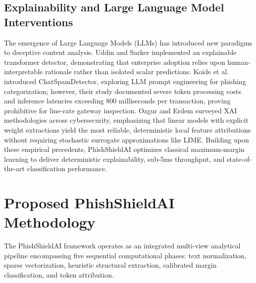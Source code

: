 \documentclass[conference]{IEEEtran}
\begin{document}
\subsection{Explainability and Large Language Model Interventions}
The emergence of Large Language Models (LLMs) has introduced new paradigms to deceptive content analysis. Uddin and Sarker \cite{uddin2024} implemented an explainable transformer detector, demonstrating that enterprise adoption relies upon human-interpretable rationale rather than isolated scalar predictions. Koide et al. \cite{koide2024} introduced ChatSpamDetector, exploring LLM prompt engineering for phishing categorization; however, their study documented severe token processing costs and inference latencies exceeding 800 milliseconds per transaction, proving prohibitive for line-rate gateway inspection. Ozgur and Erdem \cite{ozgur2023} surveyed XAI methodologies across cybersecurity, emphasizing that linear models with explicit weight extractions yield the most reliable, deterministic local feature attributions without requiring stochastic surrogate approximations like LIME. Building upon these empirical precedents, PhishShieldAI optimizes classical maximum-margin learning to deliver deterministic explainability, sub-5ms throughput, and state-of-the-art classification performance.

\section{Proposed PhishShieldAI Methodology}
The PhishShieldAI framework operates as an integrated multi-view analytical pipeline encompassing five sequential computational phases: text normalization, sparse vectorization, heuristic structural extraction, calibrated margin classification, and token attribution.
\end{document}
